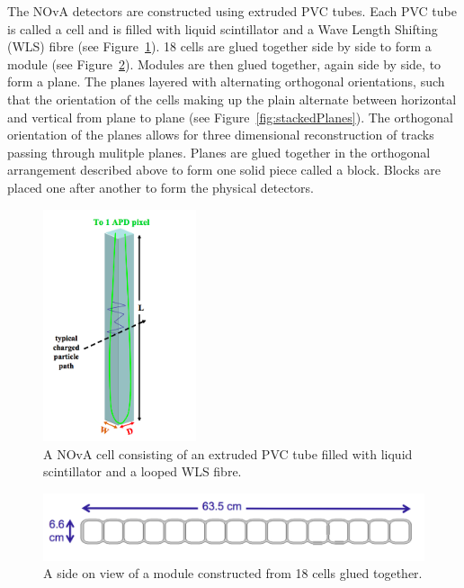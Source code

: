The NOvA detectors are constructed using extruded PVC tubes. Each PVC
tube is called a cell and is filled with liquid scintillator and a
Wave Length Shifting (WLS) fibre (see Figure~\ref{fig:cell}). 
18 cells are glued together side by side to form a module (see
Figure~\ref{fig:module}). Modules are then glued together, again side
by side,
to form a plane. The planes layered with alternating orthogonal
orientations, such that the orientation of the cells making up the
plain alternate between horizontal and vertical from plane to plane (see
Figure~\ref{fig:stackedPlanes}). The orthogonal
orientation of the planes allows for three dimensional reconstruction
of tracks passing through mulitple planes. Planes are glued together
in the orthogonal arrangement described above to form one solid piece
called a block. Blocks are placed one after another to form the
physical detectors.




\begin{figure}
  \centering
  \includegraphics[width=0.4\textwidth]{../../img/det/gen/nova_cell.png}
  \caption{A NOvA cell consisting of an extruded
    PVC tube filled with liquid scintillator and a looped WLS fibre.}
  \label{fig:cell}
\end{figure}


\begin{figure}
  \centering
  \includegraphics[width=1\textwidth]{../../img/det/gen/extru_cross_section.png}
  \caption{A side on view of a module constructed from 18 cells glued
    together.}
  \label{fig:module}
\end{figure}

